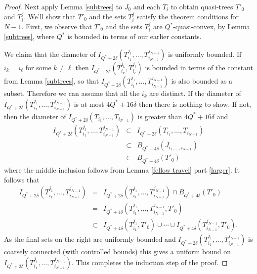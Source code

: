 \documentclass[11pt]{article}
\theoremstyle{remark}
\begin{document}
\begin{proof}
Next apply Lemma \ref{subtrees} to $J_0$ and each $T_i$ to obtain quasi-trees $T'_0$ and $T^j_i$. 
We'll show that $T'_0$ and the sets $T^j_i$ satisfy the theorem conditions for $N-1$. First, we observe that $T'_0$ and the sets $T^j_i$ are $Q^*$-quasi-convex, by Lemma \ref{subtrees}, where $Q^*$ is bounded in terms of our earlier constants.
 
 We claim that the diameter of $I_{Q^*+2\delta}(T^{j_1}_{i_1}, \dots, T^{j_{N-1}}_{i_{N-1}})$ is uniformly bounded. If $i_k = i_\ell$ for some $k \neq \ell$ then $I_{Q^*+2\delta}(T_{i_k}^{j_k}, T_{i_\ell}^{j_\ell})$ is bounded in terms of the constant from Lemma \ref{subtrees}, so that $I_{Q^*+2\delta}(T^{j_1}_{i_1}, \dots, T^{j_{N-1}}_{i_{N-1}})$ is also bounded as a subset. Therefore we can assume that all the $i_k$ are distinct. If the
 diameter of $I_{Q^*+2\delta}(T^{j_1}_{i_1}, \dots, T^{j_{N-1}}_{i_{N-1}})$ is at most $4Q^* + 16\delta$ then there is nothing to show. If not, then the diameter of $I_{Q^*+2\delta}(T_{i_1}, \dots, T_{i_{N-1}})$ is greater than $4Q^* + 16\delta$ and
\begin{eqnarray*}
I_{Q^*+2\delta}\left(T^{j_1}_{i_1}, \dots, T^{j_{N-1}}_{i_{N-1}}\right) &\subset & I_{Q^*+2\delta}(T_{i_1}, \dots, T_{i_{N-1}}) \\
& \subset & B_{Q^* + 4\delta}(J_{i_1, \dots, i_{N-1}}) \\ %
& \subset & B_{Q^*+4\delta}(T'_0)
\end{eqnarray*}
where the middle inclusion follows from Lemma \ref{fellow travel} part \eqref{larger}.
It follows that
\begin{eqnarray*}
I_{Q^*+2\delta}\left(T^{j_1}_{i_1}, \dots, T^{j_{N-1}}_{i_{N-1}}\right)& = &I_{Q^*+2\delta}\left(T^{j_1}_{i_1}, \dots, T^{j_{N-1}}_{i_{N-1}}\right) \cap B_{Q^*+4\delta}(T'_0)\\ & = & I_{Q^*+4\delta}\left(T^{j_1}_{i_1}, \dots, T^{j_{N-1}}_{i_{N-1}}, T'_0\right) \\
&\subset& I_{Q^*+4\delta}\left(T^{j_1}_{i_1}, T'_0\right) \cup \cdots \cup I_{Q^*+4\delta}\left(T^{j_{N-1}}_{i_{N-1}}, T'_0\right).
\end{eqnarray*}
As the final sets on the right are uniformly bounded and $I_{Q^*+2\delta}(T^{j_1}_{i_1}, \dots, T^{j_{N-1}}_{i_{N-1}})$ is coarsely connected (with controlled bounds) this gives a uniform bound on $I_{Q^*+2\delta}(T^{j_1}_{i_1}, \dots, T^{j_{N-1}}_{i_{N-1}})$. This completes the induction step of the proof.
\end{proof}
\end{document}
